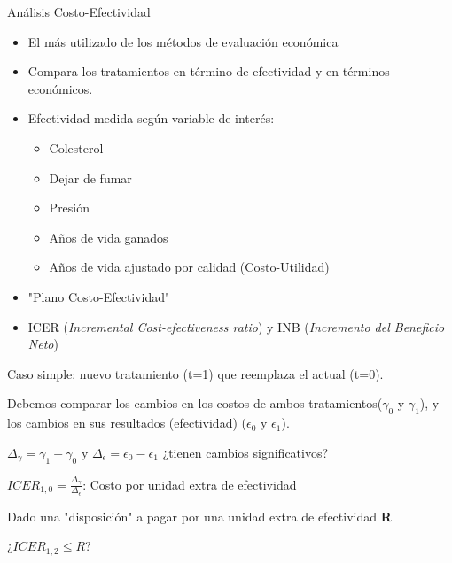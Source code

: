 \documentclass[xcolor=dvipsnames]{beamer}
\begin{document}
\begin{frame}{Análisis Costo-Efectividad}

\begin{itemize}
      \item El más utilizado de los métodos de evaluación económica
    \item Compara los tratamientos en término de efectividad y en términos económicos.
    \item Efectividad medida según variable de interés:
    \begin{itemize}
        \item Colesterol
        \item Dejar de fumar
        \item Presión
        \item Años de vida ganados
        \item Años de vida ajustado por calidad (Costo-Utilidad)
    \end{itemize}
    \item "Plano Costo-Efectividad"
    \item ICER (\textit{Incremental Cost-efectiveness ratio}) y INB (\textit{Incremento del Beneficio Neto})
    \end{itemize}
\end{frame}

\begin{frame}
    \item Caso simple: nuevo tratamiento (t=1) que reemplaza el actual (t=0).
    \item Debemos comparar los cambios en los costos de ambos tratamientos($\gamma_0$  y  $\gamma_1$), y los cambios en sus resultados (efectividad) ($\epsilon_0$  y  $\epsilon_1$).
    \item $\Delta_\gamma= \gamma_1-\gamma_0$ y $\Delta_\epsilon=\epsilon_0 - \epsilon_1$ ¿tienen cambios significativos?
    \item $ICER_{1,0}= \frac{\Delta_\gamma}{\Delta_\epsilon}$: Costo por unidad extra de efectividad
    \item Dado una "disposición" a pagar por una unidad extra de efectividad \textbf{R}
    \item ¿$ICER_{1,2} \leq R$?
\end{frame}
\end{document}
